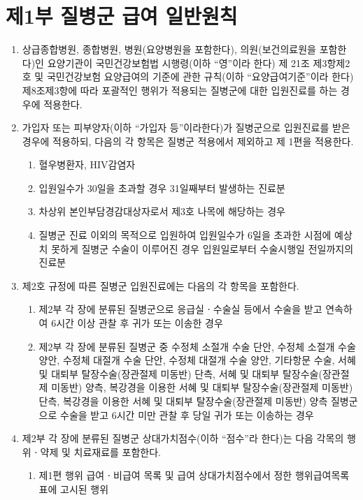 \prezi{\clearpage}
\section{제1부 질병군 급여 일반원칙}
\begin{enumerate}[1.]\tightlist
\item 상급종합병원, 종합병원, 병원(요양병원을 포함한다), 의원(보건의료원을 포함한다)인 요양기관이 국민건강보험법 시행령(이하 “영”이라 한다) 제 21조 제3항제2호 및 국민건강보험 요양급여의 기준에 관한 규칙(이하 “요양급여기준”이라 한다) 제8조제3항에 따라 포괄적인 행위가 적용되는 질병군에 대한 입원진료를 하는 경우에 적용한다.
\item 가입자 또는 피부양자(이하 “가입자 등”이라한다)가 질병군으로 입원진료를 받은 경우에 적용하되, 다음의 각 항목은 질병군 적용에서 제외하고 제 1편을 적용한다.
	\begin{enumerate}[가.]\tightlist
	\item 혈우병환자, HIV감염자
	\item 입원일수가 30일을 초과할 경우 31일째부터 발생하는 진료분
	\item 차상위 본인부담경감대상자로서 제3호 나목에 해당하는 경우
	\item 질병군 진료 이외의 목적으로 입원하여 입원일수가 6일을 초과한 시점에 예상치 못하게 질병군 수술이 이루어진 경우 입원일로부터 수술시행일 전일까지의 진료분
	\end{enumerate}
\item 제2호 규정에 따른 질병군 입원진료에는 다음의 각 항목을 포함한다.
	\begin{enumerate}[가.]\tightlist
	\item 제2부 각 장에 분류된 질병군으로 응급실ㆍ수술실 등에서 수술을 받고 연속하여 6시간 이상 관찰 후 귀가 또는 이송한 경우
	\item 제2부 각 장에 분류된 질병군 중 수정체 소절개 수술 단안, 수정체 소절개 수술 양안, 수정체 대절개 수술 단안, 수정체 대절개 수술 양안, 기타항문 수술, 서혜 및 대퇴부 탈장수술(장관절제 미동반) 단측, 서혜 및 대퇴부 탈장수술(장관절제 미동반) 양측, 복강경을 이용한 서혜 및 대퇴부 탈장수술(장관절제 미동반) 단측, 복강경을 이용한 서혜 및 대퇴부 탈장수술(장관절제 미동반) 양측 질병군으로 수술을 받고 6시간 미만 관찰 후 당일 귀가 또는 이송하는 경우
	\end{enumerate}
\item 제2부 각 장에 분류된 질병군 상대가치점수(이하 “점수”라 한다)는 다음 각목의 행위ㆍ약제 및 치료재료를 포함한다.
	\begin{enumerate}[가.]\tightlist
	\item 제1편 행위 급여ㆍ비급여 목록 및 급여 상대가치점수에서 정한 행위급여목록표에 고시된 행위

\end{enumerate}
\end{enumerate}
